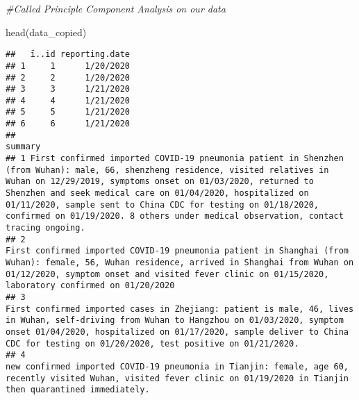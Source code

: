 \documentclass[
]{article}
\newenvironment{Shaded}{\begin{snugshade}}{\end{snugshade}}
\newcommand{\CommentTok}[1]{\textcolor[rgb]{0.56,0.35,0.01}{\textit{#1}}}
\newcommand{\FunctionTok}[1]{\textcolor[rgb]{0.00,0.00,0.00}{#1}}
\newcommand{\NormalTok}[1]{#1}
\begin{document}
\begin{Shaded}
\begin{Highlighting}[]
\CommentTok{\#Called Principle Component Analysis on our data}

\FunctionTok{head}\NormalTok{(data\_copied)}
\end{Highlighting}
\end{Shaded}

\begin{verbatim}
##   ï..id reporting.date
## 1     1      1/20/2020
## 2     2      1/20/2020
## 3     3      1/21/2020
## 4     4      1/21/2020
## 5     5      1/21/2020
## 6     6      1/21/2020
##                                                                                                                                                                                                                                                                                                                                                                                                                summary
## 1 First confirmed imported COVID-19 pneumonia patient in Shenzhen (from Wuhan): male, 66, shenzheng residence, visited relatives in Wuhan on 12/29/2019, symptoms onset on 01/03/2020, returned to Shenzhen and seek medical care on 01/04/2020, hospitalized on 01/11/2020, sample sent to China CDC for testing on 01/18/2020, confirmed on 01/19/2020. 8 others under medical observation, contact tracing ongoing.
## 2                                                                                                                                                                    First confirmed imported COVID-19 pneumonia patient in Shanghai (from Wuhan): female, 56, Wuhan residence, arrived in Shanghai from Wuhan on 01/12/2020, symptom onset and visited fever clinic on 01/15/2020, laboratory confirmed on 01/20/2020
## 3                                                                                                                                        First confirmed imported cases in Zhejiang: patient is male, 46, lives in Wuhan, self-driving from Wuhan to Hangzhou on 01/03/2020, symptom onset 01/04/2020, hospitalized on 01/17/2020, sample deliver to China CDC for testing on 01/20/2020, test positive on 01/21/2020.
## 4                                                                                                                                                                                                                                            new confirmed imported COVID-19 pneumonia in Tianjin: female, age 60, recently visited Wuhan, visited fever clinic on 01/19/2020 in Tianjin then quarantined immediately.

\end{verbatim}
\end{document}
